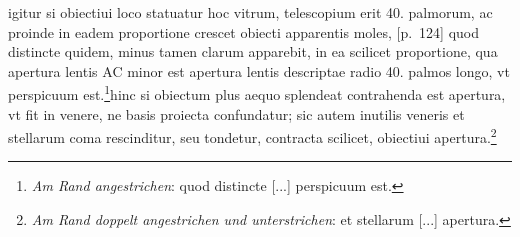 \pend \pstart [p.~123] [...] igitur si obiectiui loco statuatur  hoc vitrum, telescopium\protect{} erit 40. palmorum, ac proinde in eadem proportione crescet obiecti apparentis moles,  [p.~124] quod distincte quidem, minus tamen clarum apparebit,  in ea scilicet proportione, qua apertura lentis\protect{} AC minor est apertura lentis\protect{} descriptae radio 40. palmos longo,  vt perspicuum est.\footnote{\textit{Am Rand angestrichen}: quod distincte [...] perspicuum est.}\pend \newpage \pstart  [...] hinc si obiectum plus  aequo splendeat contrahenda est apertura, vt fit in  venere, ne basis proiecta confundatur; sic autem inutilis veneris et stellarum\protect{} coma rescinditur,  seu tondetur, contracta scilicet, obiectiui apertura.\footnote{\textit{Am Rand doppelt angestrichen und unterstrichen}: et stellarum\protect{} [...] apertura.}